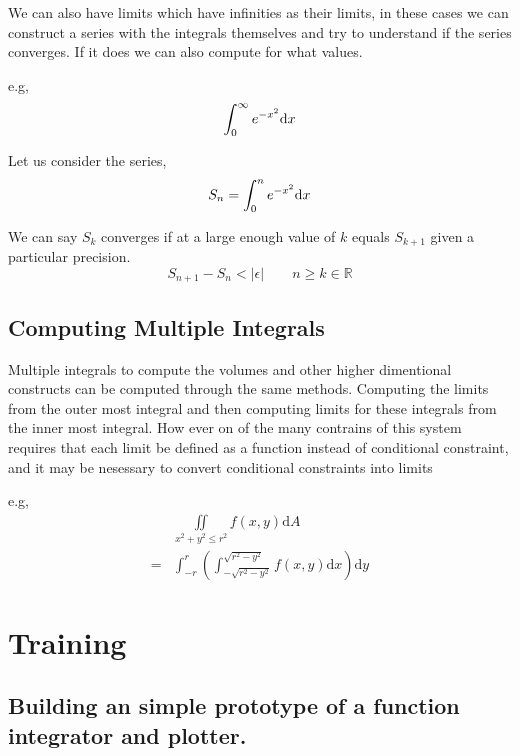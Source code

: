 \documentclass[12pt]{article}
\begin{document}
We can also have limits which have infinities as their limits, in these cases we can construct a series with
the integrals themselves and try to understand if the series converges. If it does we can also compute for what
values.

e.g,
\begin{equation*}
	\int_{0}^\infty e^{-x^2} \mathrm{d}x\\
\end{equation*}

Let us consider the series,
\begin{equation*}
	S_n = \int_{0}^n e^{-x^2} \mathrm{d}x\\
\end{equation*}

We can say $S_k$ converges if at a large enough value of $k$ equals $S_{k+1}$ given a particular precision.
\begin{equation*}
	S_{n+1} - S_{n} < \vert \epsilon \vert \quad \quad n \ge k \in \mathbb{R}
\end{equation*}

\subsection{Computing Multiple Integrals}

Multiple integrals to compute the volumes and other higher dimentional constructs can be computed through the same methods.
Computing the limits from the outer most integral and then computing limits for these integrals from the inner most integral.
How ever on of the many contrains of this system requires that each limit be defined as a function instead of conditional constraint,
and it may be nesessary to convert conditional constraints into limits

e.g,
\begin{align*}
	&\iint \limits_{x^2 + y^2 \le r^2} f(x, y) \mathrm{d}A\\
	= &\int_{-r}^{r} \left( \int_{-\sqrt{r^2 - y^2}}^{\sqrt{r^2 - y^2}} f(x, y)\mathrm{d}x \right) \mathrm{d}y
\end{align*}

\section{Training}

\subsection{Building an simple prototype of a function integrator and plotter.}
\end{document}
